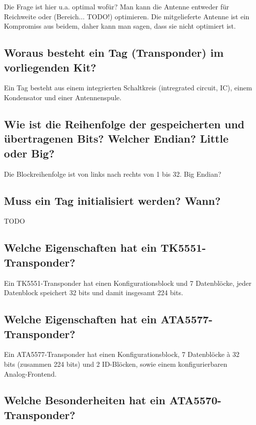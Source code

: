 \documentclass[paper=a4,fontsize=11pt,headsepline,footsepline,parskip=half]{scrartcl}
\begin{document}
Die Frage ist hier u.a. optimal wofür? Man kann die Antenne entweder für Reichweite oder (Bereich... TODO!) optimieren. Die mitgelieferte Antenne
ist ein Kompromiss aus beidem, daher kann man sagen, dass sie nicht optimiert ist.

\subsection{Woraus besteht ein Tag (Transponder) im vorliegenden Kit?}

Ein Tag besteht aus einem integrierten Schaltkreis (intregrated circuit, IC), einem Kondensator und einer Antennenspule.

\subsection{Wie ist die Reihenfolge der gespeicherten und übertragenen Bits? Welcher Endian? Little oder Big?}

Die Blockreihenfolge ist von links nach rechts von 1 bis 32. Big Endian?

\subsection{Muss ein Tag initialisiert werden? Wann?}

TODO

\subsection{Welche Eigenschaften hat ein TK5551-Transponder?}

Ein TK5551-Transponder hat einen Konfigurationsblock und 7 Datenblöcke, jeder Datenblock speichert 32 bits und damit insgesamt 224 bits.

\subsection{Welche Eigenschaften hat ein ATA5577-Transponder?}

Ein ATA5577-Transponder hat einen Konfigurationsblock, 7 Datenblöcke à 32 bits (zusammen 224 bits) und 2 ID-Blöcken, sowie einem konfigurierbaren
Analog-Frontend.

\subsection{Welche Besonderheiten hat ein ATA5570-Transponder?}
\end{document}
